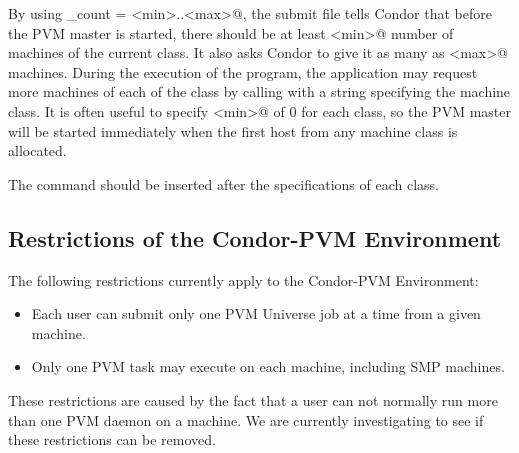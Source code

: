 By using \verb@machine_count = <min>..<max>@, the submit file tells
Condor that before the PVM master is started, there should be at least
\verb@<min>@ 
number of machines of the current class.  It also asks Condor to give
it as many as \verb@<max>@ machines.  During the execution of the program,
the application may request more machines of each of the class by calling
 with a string specifying the machine
class.
It is often useful to specify \verb@<min>@ of 0 for each
class, so the PVM master will be started immediately when the first
host from any machine class is allocated.

The  command should be inserted after the specifications of
each class.

\subsection{Restrictions of the Condor-PVM Environment}

The following restrictions currently apply to the Condor-PVM
Environment:

\begin{itemize}

\item Each user can submit only one PVM Universe job at a time from a
given machine.

\item Only one PVM task may execute on each machine, including SMP
machines.

\end{itemize}

These restrictions are caused by the fact that a user can not normally
run more than one PVM daemon on a machine.  We are currently
investigating to see if these restrictions can be removed.

